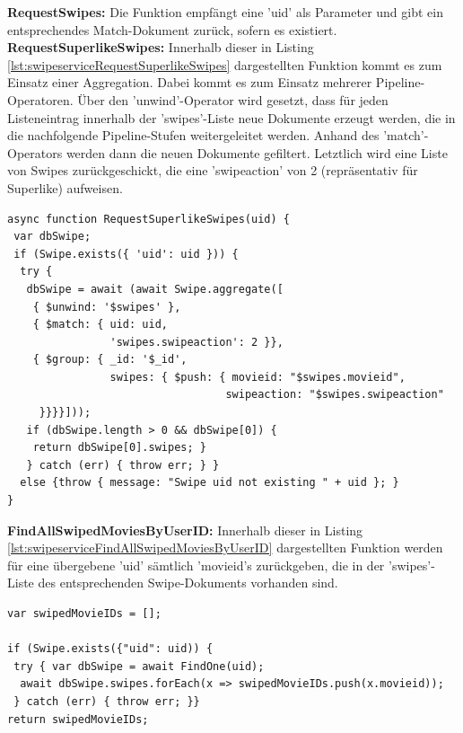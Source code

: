 \noindent
\textbf{RequestSwipes:}
Die Funktion empfängt eine 'uid' als Parameter und gibt ein entsprechendes Match-Dokument zurück, sofern es existiert.\\

\noindent
\textbf{RequestSuperlikeSwipes:}
Innerhalb dieser in Listing \ref{lst:swipeserviceRequestSuperlikeSwipes} dargestellten Funktion kommt es zum Einsatz einer Aggregation. 
Dabei kommt es zum Einsatz mehrerer Pipeline-Operatoren.
Über den 'unwind'-Operator wird gesetzt, dass für jeden Listeneintrag innerhalb der 'swipes'-Liste neue Dokumente erzeugt werden, die in die nachfolgende Pipeline-Stufen weitergeleitet werden. Anhand des 'match'-Operators werden dann die neuen Dokumente gefiltert. Letztlich wird eine Liste von Swipes zurückgeschickt, die eine 'swipeaction' von 2 (repräsentativ für Superlike) aufweisen.\\

\begin{lstlisting}[caption=Swipe Service - RequestSuperlikeSwipes, label=lst:swipeserviceRequestSuperlikeSwipes]
async function RequestSuperlikeSwipes(uid) {
 var dbSwipe;
 if (Swipe.exists({ 'uid': uid })) {
  try {
   dbSwipe = await (await Swipe.aggregate([
    { $unwind: '$swipes' },
    { $match: { uid: uid,
                'swipes.swipeaction': 2 }},
    { $group: { _id: '$_id',
                swipes: { $push: { movieid: "$swipes.movieid",
                                  swipeaction: "$swipes.swipeaction" 
     }}}}]));
   if (dbSwipe.length > 0 && dbSwipe[0]) {
    return dbSwipe[0].swipes; }
   } catch (err) { throw err; } }
  else {throw { message: "Swipe uid not existing " + uid }; }
}
\end{lstlisting}

\noindent
\textbf{FindAllSwipedMoviesByUserID:}
Innerhalb dieser in Listing \ref{lst:swipeserviceFindAllSwipedMoviesByUserID} dargestellten Funktion werden für eine übergebene 'uid' sämtlich 'movieid's zurückgeben, die in der 'swipes'-Liste des entsprechenden Swipe-Dokuments vorhanden sind.\\

\begin{lstlisting}[caption=Swipe Service - FindAllSwipedMoviesByUserID, label=lst:swipeserviceFindAllSwipedMoviesByUserID]
var swipedMovieIDs = [];
    
if (Swipe.exists({"uid": uid)) {
 try { var dbSwipe = await FindOne(uid);
  await dbSwipe.swipes.forEach(x => swipedMovieIDs.push(x.movieid));
 } catch (err) { throw err; }}
return swipedMovieIDs;
\end{lstlisting}


